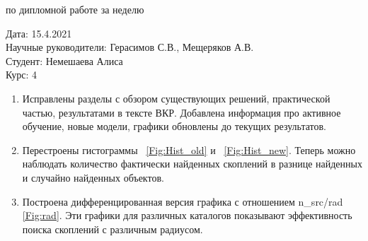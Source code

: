 \documentclass{article}
\begin{document}
\begin{center}{ по дипломной работе за неделю\\}\end{center}
Дата: 15.4.2021\\
Научные руководители: Герасимов С.В., Мещеряков А.В.\\
Студент: Немешаева Алиса\\
Курс: 4\\

\renewcommand{\labelitemi}{$\blacksquare$}
\renewcommand\labelitemii{$\square$}

\begin{enumerate}
    \item Исправлены разделы с обзором существующих решений, практической частью, результатами в 
        тексте ВКР. Добавлена информация про активное обучение, новые модели, графики обновлены до
        текущих результатов.\\
    \item Перестроены гистограммы ~\ref{Fig:Hist_old} и ~\ref{Fig:Hist_new}. Теперь можно наблюдать количество 
        фактически найденных скоплений в разнице найденных и случайно найденных объектов.\\
    \item Построена дифференцированная версия графика с отношением n\_src/rad \ref{Fig:rad}. Эти графики для 
        различных каталогов показывают эффективность поиска скоплений с различным радиусом.\\
\end{enumerate}
\end{document}
